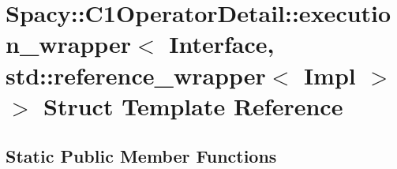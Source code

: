 \hypertarget{structSpacy_1_1C1OperatorDetail_1_1execution__wrapper_3_01Interface_00_01std_1_1reference__wrapper_3_01Impl_01_4_01_4}{\section{\-Spacy\-:\-:\-C1\-Operator\-Detail\-:\-:execution\-\_\-wrapper$<$ \-Interface, std\-:\-:reference\-\_\-wrapper$<$ \-Impl $>$ $>$ \-Struct \-Template \-Reference}
\label{structSpacy_1_1C1OperatorDetail_1_1execution__wrapper_3_01Interface_00_01std_1_1reference__wrapper_3_01Impl_01_4_01_4}
}
\subsection*{\-Static \-Public \-Member \-Functions}
